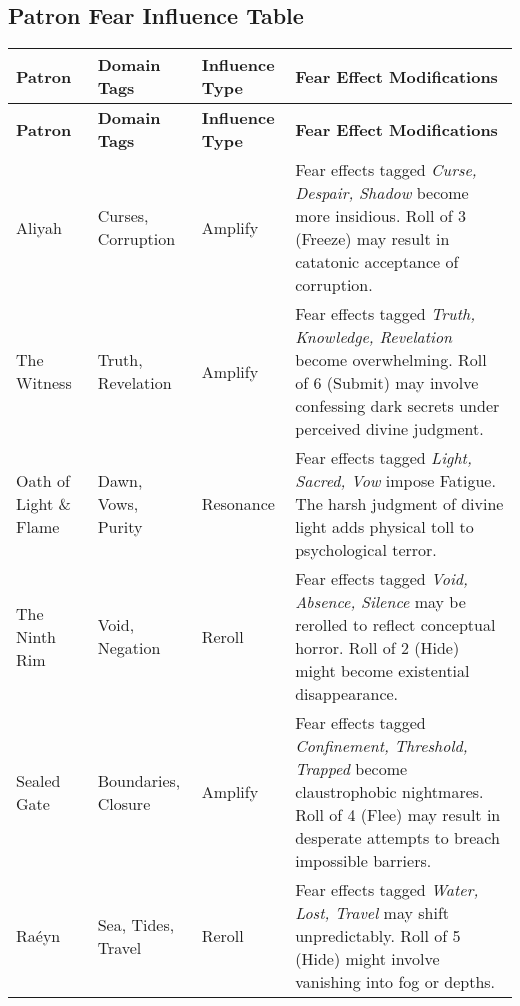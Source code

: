 \subsection{Patron Fear Influence Table}
\label{subsec:patron-fear-table}

\begin{longtable}{@{}p{3.2cm}p{4.5cm}p{2.8cm}p{5.9cm}@{}}
  \toprule
  \textbf{Patron} & \textbf{Domain Tags} & \textbf{Influence Type} & \textbf{Fear Effect Modifications} \\
  \midrule
  \endfirsthead
  
  \toprule
  \textbf{Patron} & \textbf{Domain Tags} & \textbf{Influence Type} & \textbf{Fear Effect Modifications} \\
  \midrule
  \endhead
  
  \bottomrule
  \endfoot


Aliyah & Curses, Corruption & Amplify & 
Fear effects tagged \emph{Curse, Despair, Shadow} become more insidious. Roll of 3 (Freeze) may result in catatonic acceptance of corruption. \\

The Witness & Truth, Revelation & Amplify & 
Fear effects tagged \emph{Truth, Knowledge, Revelation} become overwhelming. Roll of 6 (Submit) may involve confessing dark secrets under perceived divine judgment. \\

Oath of Light \& Flame & Dawn, Vows, Purity & Resonance & 
Fear effects tagged \emph{Light, Sacred, Vow} impose Fatigue. The harsh judgment of divine light adds physical toll to psychological terror. \\

The Ninth Rim & Void, Negation & Reroll & 
Fear effects tagged \emph{Void, Absence, Silence} may be rerolled to reflect conceptual horror. Roll of 2 (Hide) might become existential disappearance. \\

Sealed Gate & Boundaries, Closure & Amplify & 
Fear effects tagged \emph{Confinement, Threshold, Trapped} become claustrophobic nightmares. Roll of 4 (Flee) may result in desperate attempts to breach impossible barriers. \\

Raéyn & Sea, Tides, Travel & Reroll & 
Fear effects tagged \emph{Water, Lost, Travel} may shift unpredictably. Roll of 5 (Hide) might involve vanishing into fog or depths. \\


\end{longtable}
